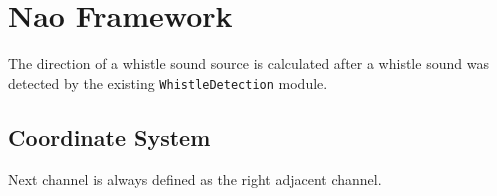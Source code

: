 \section{Nao Framework}
\label{sec:03_whistleLocalizationModule}

The direction of a whistle sound source is calculated after a whistle sound was detected
by the existing \lstinline!WhistleDetection! module.

\subsection{Coordinate System}
\label{subsec:03_coordinates}

Next channel is always defined as the right adjacent channel.